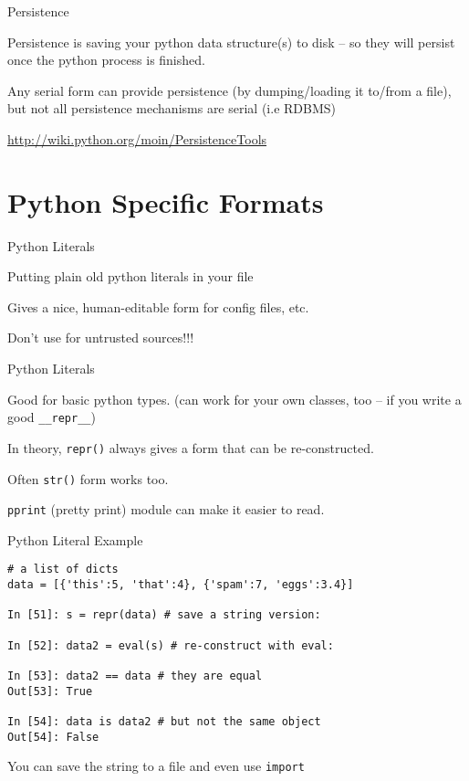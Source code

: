 \documentclass{beamer}
\begin{document}
\begin{frame}[fragile]{Persistence}

\vfill
{\Large Persistence is saving your python data structure(s) to disk -- so they
will persist once the python process is finished.}

\vfill
{\Large Any serial form can provide persistence (by dumping/loading it to/from
a file), but not all persistence mechanisms are serial (i.e RDBMS)}


\vfill
\url{http://wiki.python.org/moin/PersistenceTools}
\end{frame} 


\section{Python Specific Formats}

\begin{frame}[fragile]{Python Literals}

\vfill
{\Large Putting plain old python literals in your file}

\vfill
{\Large Gives a nice, human-editable form for config files, etc.}

\vfill
{\Large Don't use for untrusted sources!!!}

\end{frame} 

\begin{frame}[fragile]{Python Literals}

\vfill
{\Large Good for basic python types.}
(can work for your own classes, too -- if you write a good \verb|__repr__|)

\vfill
{\Large In theory, \verb|repr()| always gives a form that can be re-constructed.}

\vfill
{\Large Often \verb|str()| form works too.}

\vfill
{\Large \verb|pprint| (pretty print) module can make it easier to read.}

\end{frame} 

\begin{frame}[fragile]{Python Literal Example}

{\small
\begin{verbatim}
# a list of dicts
data = [{'this':5, 'that':4}, {'spam':7, 'eggs':3.4}]

In [51]: s = repr(data) # save a string version:

In [52]: data2 = eval(s) # re-construct with eval:

In [53]: data2 == data # they are equal
Out[53]: True

In [54]: data is data2 # but not the same object
Out[54]: False
\end{verbatim}
}
You can save the string to a file and even use \verb|import|
\end{frame} 
\end{document}
